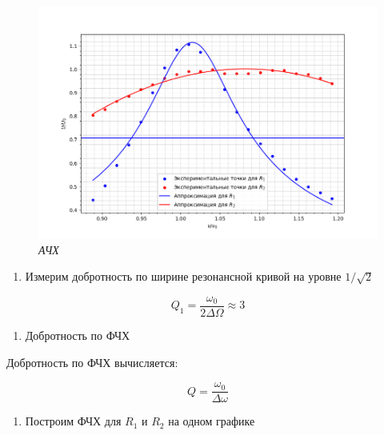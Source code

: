\documentclass[a4paper,12pt]{article}
\begin{document}
\begin{figure}[!ht]
        \centering
	\includegraphics[width=1.0\textwidth]{graph-3.png}
	\caption{\textit{АЧХ}}
	\label{graph:3}
\end{figure}

\begin{enumerate}[resume]
    \item Измерим добротность по ширине резонансной кривой на уровне $1/ \sqrt{2}$
\end{enumerate}

\begin{equation*}
    Q_1 = \frac{\omega_0}{2 \Delta \Omega} \approx 3
\end{equation*}

\begin{enumerate}[resume]
    \item Добротность по ФЧХ
\end{enumerate}

Добротность по ФЧХ вычисляется:

\begin{equation*}
    Q = \frac{\omega_0}{\Delta \omega}
\end{equation*}

\begin{enumerate}[resume]
    \item Построим ФЧХ для $R_1$ и $R_2$ на одном графике
\end{enumerate}
\end{document}
